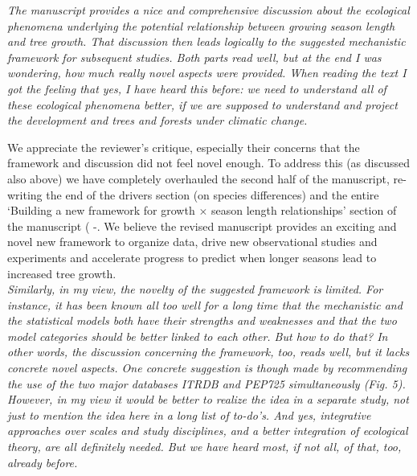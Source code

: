 \documentclass[11pt]{article}
\newcommand{\R}[1]{\label{#1}\linelabel{#1}}
\begin{document}
\emph{The manuscript provides a nice and comprehensive discussion about the ecological phenomena underlying the potential relationship between growing season length and tree growth. That discussion then leads logically to the suggested mechanistic framework for subsequent studies. Both parts read well, but at the end I was wondering, how much really novel aspects were provided. When reading the text I got the feeling that yes, I have heard this before: we need to understand all of these ecological phenomena better, if we are supposed to understand and project the development and trees and forests under climatic change.}

We appreciate the reviewer's critique, especially their concerns that the framework and discussion did not feel novel enough. To address this (as discussed also above) we have completely overhauled the second half of the manuscript, re-writing the end of the drivers section (on species differences) and the entire  `Building a new framework for growth $\times$ season length relationships' section of the manuscript ( \R{startframework}-\R{R3complaint1E}. We believe the revised manuscript provides an exciting and novel new framework to organize data, drive new observational studies and experiments and accelerate progress to predict when longer seasons lead to increased tree growth.\\

\emph{Similarly, in my view, the novelty of the suggested framework is limited. For instance, it has been known all too well for a long time that the mechanistic and the statistical models both have their strengths and weaknesses and that the two model categories should be better linked to each other. But how to do that? In other words, the discussion concerning the framework, too, reads well, but it lacks concrete novel aspects. One concrete suggestion is though made by recommending the use of the two major databases ITRDB and PEP725 simultaneously (Fig. 5). However, in my view it would be better to realize the idea in a separate study, not just to mention the idea here in a long list of to-do’s. And yes, integrative approaches over scales and study disciplines, and a better integration of ecological theory, are all definitely needed. But we have heard most, if not all, of that, too, already before.}
\end{document}
